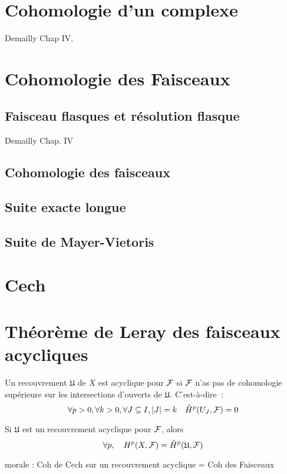 \section{Cohomologie d'un complexe}
Demailly Chap IV.

\section{Cohomologie des Faisceaux}

\subsection{Faisceau flasques et résolution flasque}
Demailly Chap. IV

\subsection{Cohomologie des faisceaux}

\subsection{Suite exacte longue}

\subsection{Suite de Mayer-Vietoris}

\section{Cech}

\section{Théorème de Leray des faisceaux acycliques}
\begin{defi}
Un recouvrement $\mathfrak{U}$ de $X$ est acyclique pour $\mathcal{F}$ si $\mathcal{F}$ n'as pas de cohomologie supérieure sur les intersections d'ouverts de $\mathfrak{U}$. C'est-à-dire~:
\[
\forall p>0, \forall k>0, \forall J \subseteq I, \vert J \vert = k \quad
\check{H}^p(U_J,\mathcal{F}) = 0
\]
\end{defi}

\begin{thm}[leray]\label{Thm_Leray}
Si $\mathfrak{U}$ est un recouvrement acyclique pour $\mathcal{F}$, alors
\begin{equation}
\forall p, \quad H^p(X,\mathcal{F}) = \check{H}^p(\mathfrak{U},\mathcal{F})
\end{equation}
\end{thm}
morale : Coh de Cech sur un recouvrement acyclique = Coh des Faisceaux

